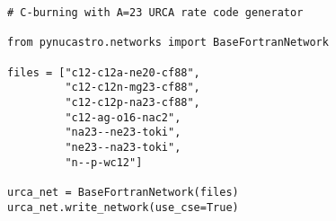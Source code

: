 \documentclass{article}
\begin{document}
\begin{verbatim}
# C-burning with A=23 URCA rate code generator

from pynucastro.networks import BaseFortranNetwork

files = ["c12-c12a-ne20-cf88",
         "c12-c12n-mg23-cf88",
         "c12-c12p-na23-cf88",
         "c12-ag-o16-nac2",
         "na23--ne23-toki",
         "ne23--na23-toki",
         "n--p-wc12"]

urca_net = BaseFortranNetwork(files)
urca_net.write_network(use_cse=True)
\end{verbatim}
\end{document}
